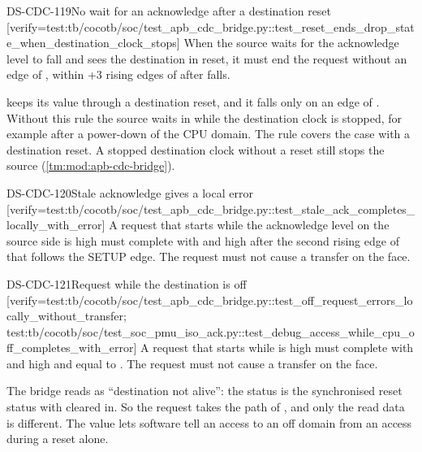\begin{requirement}{DS-CDC-119}{No wait for an acknowledge after a destination reset}
[verify={test:tb/cocotb/soc/test_apb_cdc_bridge.py::test_reset_ends_drop_state_when_destination_clock_stops}]
When the source waits for the acknowledge level to fall and sees the destination in reset, it must end the request without an edge of , within +3 rising edges of  after  falls.
\end{requirement}
\begin{rationale}
 keeps its value through a destination reset, and it falls only on an edge of . Without this rule the source waits in  while the destination clock is stopped, for example after a power-down of the CPU domain. The rule covers the case with a destination reset. A stopped destination clock without a reset still stops the source (\cref{tm:mod:apb-cdc-bridge}).
\end{rationale}

\begin{requirement}{DS-CDC-120}{Stale acknowledge gives a local error}
[verify={test:tb/cocotb/soc/test_apb_cdc_bridge.py::test_stale_ack_completes_locally_with_error}]
A request that starts while the acknowledge level on the source side is high must complete with  and  high after the second rising edge of  that follows the SETUP edge. The request must not cause a transfer on the  face.
\end{requirement}

\begin{requirement}{DS-CDC-121}{Request while the destination is off}
[verify={test:tb/cocotb/soc/test_apb_cdc_bridge.py::test_off_request_errors_locally_without_transfer; test:tb/cocotb/soc/test_soc_pmu_iso_ack.py::test_debug_access_while_cpu_off_completes_with_error}]
A request that starts while  is high must complete with  and  high and  equal to . The request must not cause a transfer on the  face.
\end{requirement}
\begin{rationale}
The bridge reads  as ``destination not alive'': the status  is the synchronised reset status with  cleared in. So the request takes the path of , and only the read data is different. The value  lets software tell an access to an off domain from an access during a reset alone.
\end{rationale}

